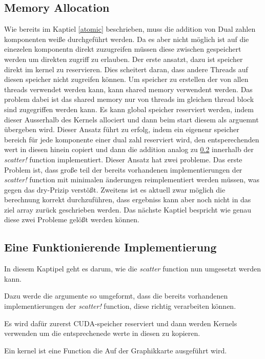 \subsection{Memory Allocation}

Wie bereits im Kaptiel \ref{atomic} beschrieben, muss die addition von Dual zahlen komponenten weiße durchgeführt werden.
Da es aber nicht möglich ist auf die einezelen komponentn direkt zuzugreifen müssen diese zwischen gespeichert werden um direkten zugriff zu erlauben.
Der erste ansatzt, dazu ist speicher direkt im kernel zu reservieren.
Dies scheitert daran, dass andere Threads auf diesen speicher nicht zugreifen können.
Um speicher zu erstellen der von allen threads verwendet werden kann, kann shared memory verwendent werden.
Das problem dabei ist das shared memory nur von threads im gleichen thread block sind zugegriffen werden kann.
Es kann global speicher reserviert werden, indem dieser Ausserhalb des Kernels allociert und dann beim start diesem als arguemnt übergeben wird.
Dieser Ansatz führt zu erfolg, indem ein eigenenr speicher bereich für jede komponente einer dual zahl reserviert wird, den entsperechenden wert in diesen hinein copiert
und dann die addition analog zu \ref{} innerhalb der \textit{scatter!} function implementiert.
Dieser Ansatz hat zwei probleme.
Das erste Problem ist, dass große teil der bereits vorhandenen implementierungen der \textit{scatter!} function mit minimalen änderungen reimplementiert werden müssen, was 
gegen das dry-Prizip verstößt.
Zweitens ist es aktuell zwar möglich die berechnung korrekt durchzuführen, dass ergebniss kann aber noch nicht in das ziel array zurück geschrieben werden.
Das nächste Kaptiel bespricht wie genau diese zwei Probleme gelößt werden können.


\subsection{Eine Funktionierende Implementierung}

In diesem Kaptipel geht es darum, wie die \textit{scatter} function nun umgesetzt werden kann.

Dazu werde die argumente so umgeformt, 
dass die bereits vorhandenen implementierungen der \textit{scatter!} function, diese richtig verarbeiten können.

Es wird dafür zurerst CUDA-speicher reserviert und dann werden Kernels verwenden um 
die entsprechenede werte in diesen zu kopieren.

Ein kernel ist eine Function die Auf der Graphikkarte ausgeführt wird.

